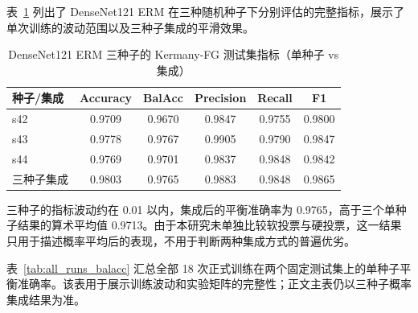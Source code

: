 \documentclass[12pt,a4paper,UTF8,openany]{ctexbook}
\begin{document}
表~\ref{tab:supp_per_seed} 列出了 DenseNet121 ERM 在三种随机种子下分别评估的完整指标，展示了单次训练的波动范围以及三种子集成的平滑效果。

\begin{table}[htbp]
\centering
\caption{DenseNet121 ERM 三种子的 Kermany-FG 测试集指标（单种子 vs 集成）}
\label{tab:supp_per_seed}
\renewcommand{\arraystretch}{1.2}
\begin{tabular}{lccccc}
\toprule
\textbf{种子/集成} & \textbf{Accuracy} & \textbf{BalAcc} & \textbf{Precision} & \textbf{Recall} & \textbf{F1} \\
\midrule
s42 & 0.9709 & 0.9670 & 0.9847 & 0.9755 & 0.9800 \\
s43 & 0.9778 & 0.9767 & 0.9905 & 0.9790 & 0.9847 \\
s44 & 0.9769 & 0.9701 & 0.9837 & 0.9848 & 0.9842 \\
\midrule
三种子集成 & 0.9803 & 0.9765 & 0.9883 & 0.9848 & 0.9865 \\
\bottomrule
\end{tabular}
\end{table}

三种子的指标波动约在 0.01 以内，集成后的平衡准确率为 0.9765，高于三个单种子结果的算术平均值 0.9713。由于本研究未单独比较软投票与硬投票，这一结果只用于描述概率平均后的表现，不用于判断两种集成方式的普遍优劣。

表~\ref{tab:all_runs_balacc} 汇总全部 18 次正式训练在两个固定测试集上的单种子平衡准确率。该表用于展示训练波动和实验矩阵的完整性；正文主表仍以三种子概率集成结果为准。
\end{document}

